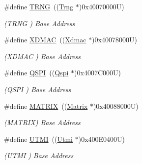 \begin{DoxyCompactItemize}
\mbox{\label{group__SAME70J19__base_ga4cab97ed4b9b87448b2338e4c13c9862}} 
\#define \mbox{\hyperlink{group__SAME70J19__base_ga4cab97ed4b9b87448b2338e4c13c9862}{T\+R\+NG}}~((\mbox{\hyperlink{structTrng}{Trng}}   $\ast$)0x40070000\+U)
\begin{DoxyCompactList}\small\item\em (T\+R\+NG ) Base Address \end{DoxyCompactList}\item 
\mbox{\label{group__SAME70J19__base_ga605482ac0afa782a315f3b556c2f018b}} 
\#define \mbox{\hyperlink{group__SAME70J19__base_ga605482ac0afa782a315f3b556c2f018b}{X\+D\+M\+AC}}~((\mbox{\hyperlink{structXdmac}{Xdmac}}  $\ast$)0x40078000\+U)
\begin{DoxyCompactList}\small\item\em (X\+D\+M\+AC ) Base Address \end{DoxyCompactList}\item 
\mbox{\label{group__SAME70J19__base_gac24e1e8116a508fa623bdaf91e7f9b63}} 
\#define \mbox{\hyperlink{group__SAME70J19__base_gac24e1e8116a508fa623bdaf91e7f9b63}{Q\+S\+PI}}~((\mbox{\hyperlink{structQspi}{Qspi}}   $\ast$)0x4007\+C000\+U)
\begin{DoxyCompactList}\small\item\em (Q\+S\+PI ) Base Address \end{DoxyCompactList}\item 
\mbox{\label{group__SAME70J19__base_gaf1d98fb728b5c7300f80dd782702d1dd}} 
\#define \mbox{\hyperlink{group__SAME70J19__base_gaf1d98fb728b5c7300f80dd782702d1dd}{M\+A\+T\+R\+IX}}~((\mbox{\hyperlink{structMatrix}{Matrix}} $\ast$)0x40088000\+U)
\begin{DoxyCompactList}\small\item\em (M\+A\+T\+R\+IX) Base Address \end{DoxyCompactList}\item 
\mbox{\label{group__SAME70J19__base_gad5125a5327cd80988f408e482e5f9d94}} 
\#define \mbox{\hyperlink{group__SAME70J19__base_gad5125a5327cd80988f408e482e5f9d94}{U\+T\+MI}}~((\mbox{\hyperlink{structUtmi}{Utmi}}   $\ast$)0x400\+E0400\+U)
\begin{DoxyCompactList}\small\item\em (U\+T\+MI ) Base Address \end{DoxyCompactList}\item 

\end{DoxyCompactItemize}
